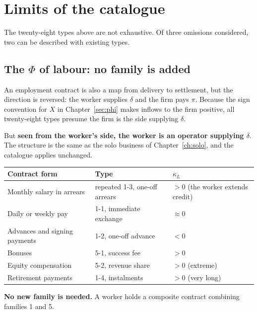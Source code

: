 \section{Limits of the catalogue}

The twenty-eight types above are not exhaustive. Of three omissions considered, two can be
described with existing types.

\subsection{The \texorpdfstring{$\Phi$}{Phi} of labour: no family is added}
\label{sec:labor-phi}

An employment contract is also a map from delivery to settlement, but the direction is
reversed: the worker supplies $\delta$ and the firm pays $\pi$. Because the sign convention
for $X$ in Chapter~\ref{sec:phi} makes inflows to the firm positive, all twenty-eight types
presume the firm is the side supplying $\delta$.

But \textbf{seen from the worker's side, the worker is an operator supplying $\delta$}.
The structure is the same as the solo business of Chapter~\ref{ch:solo}, and the catalogue
applies unchanged.

\begin{center}
\begin{tabularx}{\textwidth}{@{}lXl@{}}
\toprule
Contract form & Type & $\kappa_L$ \\
\midrule
Monthly salary in arrears & repeated 1-3, one-off arrears & $>0$ (the worker extends credit) \\
Daily or weekly pay & 1-1, immediate exchange & $\approx 0$ \\
Advances and signing payments & 1-2, one-off advance & $<0$ \\
Bonuses & 5-1, success fee & $>0$ \\
Equity compensation & 5-2, revenue share & $>0$ (extreme) \\
Retirement payments & 1-4, instalments & $>0$ (very long) \\
\bottomrule
\end{tabularx}
\label{tab:labor-phi-mapping}
\end{center}

\textbf{No new family is needed.} A worker holds a composite contract combining families 1
and 5.

